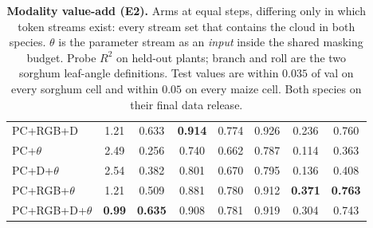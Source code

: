 \begin{table}[t]
\begin{tabular}{l c cccccc}
    PC+RGB+D           & 1.21 & 0.633 & \textbf{0.914} & 0.774 & 0.926 & 0.236 & 0.760 \\
    PC+$\theta$        & 2.49 & 0.256 & 0.740 & 0.662 & 0.787 & 0.114 & 0.363 \\
    PC+D+$\theta$      & 2.54 & 0.382 & 0.801 & 0.670 & 0.795 & 0.136 & 0.408 \\
    PC+RGB+$\theta$    & 1.21 & 0.509 & 0.881 & 0.780 & 0.912 & \textbf{0.371} & \textbf{0.763} \\
    PC+RGB+D+$\theta$  & \textbf{0.99} & \textbf{0.635} & 0.908 & 0.781 & 0.919 & 0.304 & 0.743 \\
    \bottomrule
  \end{tabular}
  \caption{\textbf{Modality value-add (E2).} Arms at equal steps, differing
  only in which token streams exist: every stream set that contains the cloud
  in both species. $\theta$ is the parameter
  stream as an \emph{input} inside the shared masking budget. Probe $R^2$ on
  held-out plants; branch and roll are the two sorghum leaf-angle definitions.
  Test values are within $0.035$ of val on every sorghum cell and within
  $0.05$ on every maize cell. Both species on their final data release.}
  \label{tab:e2}
\end{table}

